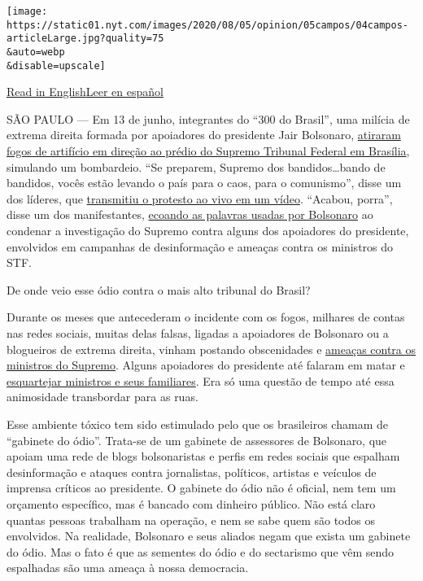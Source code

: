 \texttt{[image: https://static01.nyt.com/images/2020/08/05/opinion/05campos/04campos-articleLarge.jpg?quality=75\\\&auto=webp\\\&disable=upscale]}

\href{https://www.nytimes.com/2020/08/04/opinion/bolsonaro-office-of-hate-brazil.html}{Read
in
English}\href{https://www.nytimes.com/es/2020/08/04/espanol/opinion/bolsonaro-oficina-odio-brasil.html}{Leer
en español}

SÃO PAULO --- Em 13 de junho, integrantes do ``300 do Brasil'', uma
milícia de extrema direita formada por apoiadores do presidente Jair
Bolsonaro,
\href{https://www1.folha.uol.com.br/poder/2020/05/sara-winter-xinga-moraes-diz-querer-trocar-socos-com-ele-e-promete-inferniza-lo.shtml}{atiraram
fogos de artifício em direção ao prédio do Supremo Tribunal Federal em
Brasília}, simulando um bombardeio. ``Se preparem, Supremo dos
bandidos\ldots{}bando de bandidos, vocês estão levando o país para o
caos, para o comunismo'', disse um dos líderes, que
\href{https://www.metropoles.com/brasil/video-bolsonaristas-lancam-fogos-de-artificio-em-predio-do-stf}{transmitiu
o protesto ao vivo em um vídeo}. ``Acabou, porra'', disse um dos
manifestantes,
\href{https://www.youtube.com/watch?v=I2bZoC8FHJI}{ecoando as palavras
usadas por Bolsonaro} ao condenar a investigação do Supremo contra
alguns dos apoiadores do presidente, envolvidos em campanhas de
desinformação e ameaças contra os ministros do STF.

De onde veio esse ódio contra o mais alto tribunal do Brasil?

Durante os meses que antecederam o incidente com os fogos, milhares de
contas nas redes sociais, muitas delas falsas, ligadas a apoiadores de
Bolsonaro ou a blogueiros de extrema direita, vinham postando
obscenidades e
\href{https://www1.folha.uol.com.br/poder/2020/05/sara-winter-xinga-moraes-diz-querer-trocar-socos-com-ele-e-promete-inferniza-lo.shtml}{ameaças
contra os ministros do Supremo}. Alguns apoiadores do presidente até
falaram em matar e
\href{https://g1.globo.com/politica/noticia/2020/06/17/moraes-vota-pela-legalidade-e-continuidade-do-inquerito-das-fake-news.ghtml}{esquartejar
ministros e seus familiares}. Era só uma questão de tempo até essa
animosidade transbordar para as ruas.

Esse ambiente tóxico tem sido estimulado pelo que os brasileiros chamam
de ``gabinete do ódio''. Trata-se de um gabinete de assessores de
Bolsonaro, que apoiam uma rede de blogs bolsonaristas e perfis em redes
sociais que espalham desinformação e ataques contra jornalistas,
políticos, artistas e veículos de imprensa críticos ao presidente. O
gabinete do ódio não é oficial, nem tem um orçamento específico, mas é
bancado com dinheiro público. Não está claro quantas pessoas trabalham
na operação, e nem se sabe quem são todos os envolvidos. Na realidade,
Bolsonaro e seus aliados negam que exista um gabinete do ódio. Mas o
fato é que as sementes do ódio e do sectarismo que vêm sendo espalhadas
são uma ameaça à nossa democracia.

